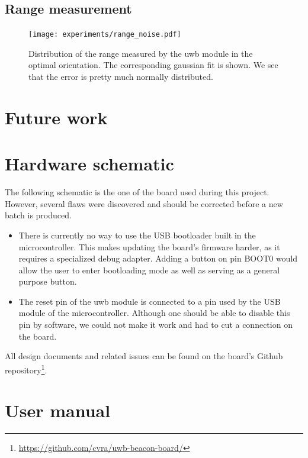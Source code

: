 \documentclass[a4paper, 12pt]{scrreprt}
\begin{document}
\section{Range measurement}
\label{sec:range_result}


\begin{figure}[h]
    \centering
    \texttt{[image: experiments/range\_noise.pdf]}
    \caption{Distribution of the range measured by the \gls{uwb} module in the optimal orientation.
        The corresponding gaussian fit is shown.
        We see that the error is pretty much normally distributed.
    }
    \label{fig:range_noise}
\end{figure}


\chapter{Future work}
\appendix
\chapter{Hardware schematic}

The following schematic is the one of the board used during this project.
However, several flaws were discovered and should be corrected before a new batch is produced.

\begin{itemize}
    \item There is currently no way to use the USB bootloader built in the microcontroller.
        This makes updating the board's firmware harder, as it requires a specialized debug adapter.
        Adding a button on pin BOOT0 would allow the user to enter bootloading mode as well as serving as a general purpose button.
    \item The reset pin of the \gls{uwb} module is connected to a pin used by the USB module of the microcontroller.
        Although one should be able to disable this pin by software, we could not make it work and had to cut a connection on the board.
\end{itemize}

All design documents and related issues can be found on the board's Github repository\footnote{\url{https://github.com/cvra/uwb-beacon-board/}}.




\chapter{User manual}


\clearpage
\nocite{*} %


\end{document}

